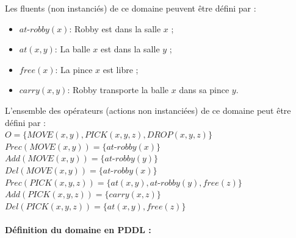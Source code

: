 \newpage

\noindent Les fluents (non instanciés) de ce domaine peuvent être défini par :
\begin{itemize}
	\item $at$-$robby(x)$: Robby est dans la salle $x$ ;
	\item $at(x,y)$: La balle $x$ est dans la salle $y$ ;
	\item $free(x)$: La pince $x$ est libre ;
	\item $carry(x,y)$: Robby transporte la balle $x$ dans sa pince $y$.
\end{itemize}

\noindent L'ensemble des opérateurs (actions non instanciées) de ce domaine peut être défini par :\\ $O=\{MOVE(x,y),PICK(x,y,z),DROP(x,y,z)\}$\\

\noindent $Prec(MOVE(x,y)) = \{at$-$robby(x)\}$\\
$Add(MOVE(x,y)) = \{at$-$robby(y)\}$\\
$Del(MOVE(x,y)) = \{at$-$robby(x)\}$\\

\noindent $Prec(PICK(x,y,z)) = \{at(x,y),at$-$robby(y),free(z)\}$\\
$Add(PICK(x,y,z)) = \{carry(x,z)\}$\\
$Del(PICK(x,y,z)) = \{at(x,y),free(z)\}$




\paragraph{Définition du domaine en PDDL :}~\\

